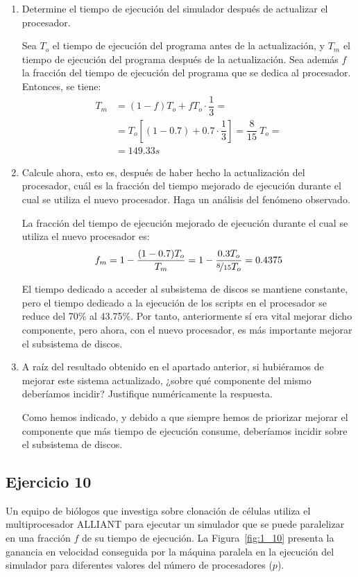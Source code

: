 \begin{enumerate}
    \item Determine el tiempo de ejecución del simulador después de actualizar el procesador.
    
    Sea $T_o$ el tiempo de ejecución del programa antes de la actualización, y $T_m$ el tiempo de ejecución del programa después de la actualización. Sea además $f$ la fracción del tiempo de ejecución del programa que se dedica al procesador. Entonces, se tiene:
    \begin{align*}
        T_m &= (1-f)T_o + fT_o\cdot \dfrac{1}{3}
        =\\&= T_o\left[(1-0.7) + 0.7\cdot \dfrac{1}{3}\right]
        = \dfrac{8}{15}\ T_o
        =\\&= 149.33s
    \end{align*}
    \item Calcule ahora, esto es, después de haber hecho la actualización del procesador, cuál es la fracción del tiempo mejorado de ejecución durante el cual se utiliza el nuevo procesador. Haga un análisis del fenómeno observado.
    
    La fracción del tiempo de ejecución mejorado de ejecución durante el cual se utiliza el nuevo procesador es:
    \begin{equation*}
        f_m = 1-\dfrac{(1-0.7)T_o}{T_m} = 1-\dfrac{0.3T_o}{\nicefrac{8}{15}T_o} = 0.4375
    \end{equation*}

    El tiempo dedicado a acceder al subsistema de discos se mantiene constante, pero el tiempo dedicado a la ejecución de los scripts en el procesador se reduce del 70\% al 43.75\%. Por tanto, anteriormente sí era vital mejorar dicho componente, pero ahora, con el nuevo procesador, es más importante mejorar el subsistema de discos.
    \item A raíz del resultado obtenido en el apartado anterior, si hubiéramos de mejorar este sistema actualizado, ¿sobre qué componente del mismo deberíamos incidir? Justifique numéricamente la respuesta.
    
    Como hemos indicado, y debido a que siempre hemos de priorizar mejorar el componente que más tiempo de ejecución consume, deberíamos incidir sobre el subsistema de discos.
\end{enumerate}

\subsection*{Ejercicio 10}
Un equipo de biólogos que investiga sobre clonación de células utiliza el multiprocesador ALLIANT para ejecutar un simulador que se puede paralelizar en una fracción $f$ de su tiempo de ejecución. La Figura~\ref{fig:1_10} presenta la ganancia en velocidad conseguida por la máquina paralela en la ejecución del simulador para diferentes valores del número de procesadores ($p$).\\

